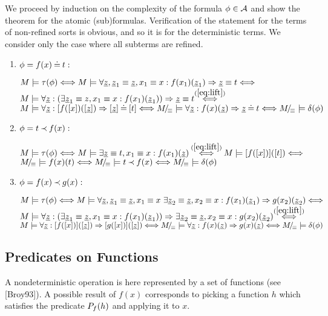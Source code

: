 \begin{PROOF}
We proceed by induction on the complexity of the formula $\phi\in\cal A$ and show the theorem for the atomic (sub)formulas. Verification of the statement for the terms of non-refined sorts is obvious, and so it is for the deterministic terms. We consider only the case where all subterms are refined. \begin{enumerate}
\item $\phi = f(x)\mathbin{\doteq} t:$

$M\models\tau(\phi) \mathrel{\Longleftrightarrow}
M\models \forall \underline{z}, \underline{z}_1\equiv \underline{z},x_1\equiv x: f(x_1)(\underline{z}_1) \mathrel\Rightarrow \underline{z}\equiv t \mathrel{\Longleftrightarrow} $\\
$M\models \forall \Ul z:(\exists \Ul z_1\equiv z,x_1\equiv x: f(x_1)(\Ul z_1))
\impl \Ul z\equiv t
\ToT{\re{eq:lift}} $\\
$M\models \forall \underline{z}: [f([x])([\underline{z}]) \mathrel\Rightarrow [\underline{z}]\mathbin{\doteq} [t] \mathrel{\Longleftrightarrow} M\!{\textstyle /}\!_\equiv\models \forall \underline{z}: f(x)(\underline{z}) \mathrel\Rightarrow \underline{z}\mathbin{\doteq} t \mathrel{\Longleftrightarrow} 
M\!{\textstyle /}\!_\equiv\models \delta(\phi)$
\item $\phi = t\mathbin{\prec} f(x):$

$M\models \tau(\phi)\ifff
M\models \exists \Ul z\equiv t, x_1\equiv x: f(x_1)(\Ul z) \ToT{\re{eq:lift}} M\models [f([x])]([t]) \ifff $\\
$M\!{\textstyle /}\!_\equiv\models f(x)(t) \mathrel{\Longleftrightarrow}
M\!{\textstyle /}\!_\equiv\models t\mathbin{\prec} f(x) \mathrel{\Longleftrightarrow} M\!{\textstyle /}\!_\equiv\models \delta(\phi)$ \item $\phi = f(x)\mathbin{\prec} g(x):$

$M\models \tau(\phi)\mathrel{\Longleftrightarrow} M\models
\forall \underline{z}, \underline{z}_1\equiv \underline{z}, x_1\equiv x\ \exists \underline{z}_2\equiv \underline{z}, x_2\equiv x: f(x_1)(\underline{z}_1)\mathrel\Rightarrow g(x_2)(\underline{z}_2)
\mathrel{\Longleftrightarrow} $\\
$M\models
\forall \Ul z : (\exists \Ul z_1\equiv \Ul z, x_1\equiv x : f(x_1)(\Ul z_1)) \impl \exists \Ul z_2\equiv \Ul z, x_2\equiv x: g(x_2)(\Ul z_2) \ToT{\re{eq:lift}} $\\
$M\models \forall\underline{z}:[f([x])]([\underline{z}])\mathrel\Rightarrow [g([x])]([\underline{z}]) \mathrel{\Longleftrightarrow}
M\!{\textstyle /}\!_\equiv\models \forall \underline{z}: f(x)(\underline{z})\mathrel\Rightarrow g(x)(\underline{z}) \mathrel{\Longleftrightarrow} M\!{\textstyle /}\!_\equiv\models \delta(\phi)$
\end{enumerate}
\end{PROOF}
%
\subsection{Predicates on Functions}
A nondeterministic operation is here represented by a set of functions (see [Broy93]). A
possible result of $f(x)$ corresponds to picking a function $h$ which satisfies the predicate $P_{f}(h)$ and applying it to $x$. 

